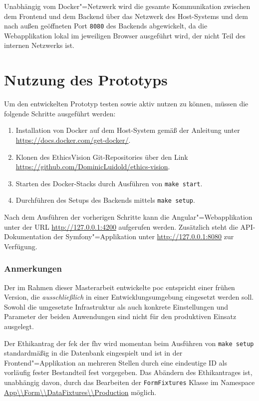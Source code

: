 \documentclass[a4paper,12pt,twoside]{scrreprt}
\begin{document}
Unabhängig vom Docker"=Netzwerk wird die gesamte Kommunikation zwischen dem Frontend und dem Backend über das Netzwerk des Host-Systems und dem nach außen geöffneten Port \texttt{8080} des Backends abgewickelt, da die Webapplikation lokal im jeweiligen Browser ausgeführt wird, der nicht Teil des internen Netzwerks ist.

\section{Nutzung des Prototyps}
\label{section:nutzung-prototyp}

Um den entwickelten Prototyp testen sowie aktiv nutzen zu können, müssen die folgende Schritte ausgeführt werden:

\begin{enumerate}
    \item Installation von Docker auf dem Host-System gemäß der Anleitung unter \url{https://docs.docker.com/get-docker/}.
    \item Klonen des EthicsVision Git-Repositories über den Link \url{https://github.com/DominicLuidold/ethics-vision}.
    \item Starten des Docker-Stacks durch Ausführen von \texttt{make start}.
    \item Durchführen des Setups des Backends mittels \texttt{make setup}.
\end{enumerate}

\noindent Nach dem Ausführen der vorherigen Schritte kann die Angular"=Webapplikation unter der URL \url{http://127.0.0.1:4200} aufgerufen werden. Zusätzlich steht die API-Dokumentation der Symfony"=Applikation unter \url{http://127.0.0.1:8080} zur Verfügung.

\subsubsection*{Anmerkungen}
Der im Rahmen dieser Masterarbeit entwickelte \ac{poc} entspricht einer frühen Version, die \textit{ausschließlich} in einer Entwicklungsumgebung eingesetzt werden soll. Sowohl die umgesetzte Infrastruktur als auch konkrete Einstellungen und Parameter der beiden Anwendungen sind nicht für den produktiven Einsatz ausgelegt.

\medskip

Der Ethikantrag der \acl{fek} der \acl{fhv} wird momentan beim Ausführen von \texttt{make setup} standardmäßig in die Datenbank eingespielt und ist in der Frontend"=Applikation an mehreren Stellen durch eine eindeutige ID als vorläufig fester Bestandteil fest vorgegeben. Das Abändern des Ethikantrages ist, unabhängig davon, durch das Bearbeiten der \texttt{FormFixtures} Klasse im Namespace \url{App\\Form\\DataFixtures\\Production} möglich.
\end{document}
